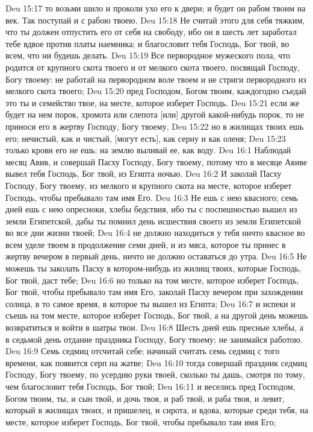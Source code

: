 Deu 15:17  то возьми шило и проколи ухо его к двери; и будет он рабом твоим на век. Так поступай и с рабою твоею.
Deu 15:18  Не считай этого для себя тяжким, что ты должен отпустить его от себя на свободу, ибо он в шесть лет заработал тебе вдвое против платы наемника; и благословит тебя Господь, Бог твой, во всем, что ни будешь делать.
Deu 15:19  Все первородное мужеского пола, что родится от крупного скота твоего и от мелкого скота твоего, посвящай Господу, Богу твоему: не работай на первородном воле твоем и не стриги первородного из мелкого скота твоего;
Deu 15:20  пред Господом, Богом твоим, каждогодно съедай это ты и семейство твое, на месте, которое изберет Господь.
Deu 15:21  если же будет на нем порок, хромота или слепота [или] другой какой-нибудь порок, то не приноси его в жертву Господу, Богу твоему,
Deu 15:22  но в жилищах твоих ешь его; нечистый, как и чистый, [могут есть], как серну и как оленя;
Deu 15:23  только крови его не ешь: на землю выливай ее, как воду.
Deu 16:1  Наблюдай месяц Авив, и совершай Пасху Господу, Богу твоему, потому что в месяце Авиве вывел тебя Господь, Бог твой, из Египта ночью.
Deu 16:2  И заколай Пасху Господу, Богу твоему, из мелкого и крупного скота на месте, которое изберет Господь, чтобы пребывало там имя Его.
Deu 16:3  Не ешь с нею квасного; семь дней ешь с нею опресноки, хлебы бедствия, ибо ты с поспешностью вышел из земли Египетской, дабы ты помнил день исшествия своего из земли Египетской во все дни жизни твоей;
Deu 16:4  не должно находиться у тебя ничто квасное во всем уделе твоем в продолжение семи дней, и из мяса, которое ты принес в жертву вечером в первый день, ничто не должно оставаться до утра.
Deu 16:5  Не можешь ты заколать Пасху в котором-нибудь из жилищ твоих, которые Господь, Бог твой, даст тебе;
Deu 16:6  но только на том месте, которое изберет Господь, Бог твой, чтобы пребывало там имя Его, заколай Пасху вечером при захождении солнца, в то самое время, в которое ты вышел из Египта;
Deu 16:7  и испеки и съешь на том месте, которое изберет Господь, Бог твой, а на другой день можешь возвратиться и войти в шатры твои.
Deu 16:8  Шесть дней ешь пресные хлебы, а в седьмой день отдание праздника Господу, Богу твоему; не занимайся работою.
Deu 16:9  Семь седмиц отсчитай себе; начинай считать семь седмиц с того времени, как появится серп на жатве;
Deu 16:10  тогда совершай праздник седмиц Господу, Богу твоему, по усердию руки твоей, сколько ты дашь, смотря по тому, чем благословит тебя Господь, Бог твой;
Deu 16:11  и веселись пред Господом, Богом твоим, ты, и сын твой, и дочь твоя, и раб твой, и раба твоя, и левит, который в жилищах твоих, и пришелец, и сирота, и вдова, которые среди тебя, на месте, которое изберет Господь, Бог твой, чтобы пребывало там имя Его;
